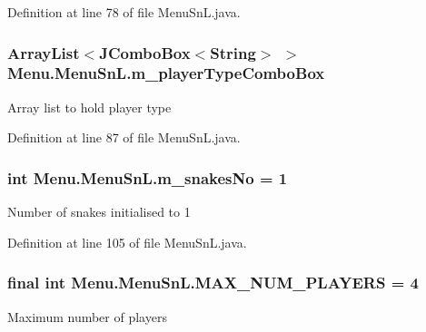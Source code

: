 Definition at line 78 of file Menu\+Sn\+L.\+java.

\hypertarget{class_menu_1_1_menu_sn_l_a70c6fa4562124ab11bab5d572daf82b3}{}
\subsubsection[{m\+\_\+player\+Type\+Combo\+Box}]{\setlength{\rightskip}{0pt plus 5cm}Array\+List$<$J\+Combo\+Box$<$String$>$ $>$ Menu.\+Menu\+Sn\+L.\+m\+\_\+player\+Type\+Combo\+Box\hspace{0.3cm}{\ttfamily [private]}}\label{class_menu_1_1_menu_sn_l_a70c6fa4562124ab11bab5d572daf82b3}
Array list to hold player type 

Definition at line 87 of file Menu\+Sn\+L.\+java.

\hypertarget{class_menu_1_1_menu_sn_l_a5787c03e612eb9adb0f0ee976810be88}{}
\subsubsection[{m\+\_\+snakes\+No}]{\setlength{\rightskip}{0pt plus 5cm}int Menu.\+Menu\+Sn\+L.\+m\+\_\+snakes\+No = 1\hspace{0.3cm}{\ttfamily [private]}}\label{class_menu_1_1_menu_sn_l_a5787c03e612eb9adb0f0ee976810be88}
Number of snakes initialised to 1 

Definition at line 105 of file Menu\+Sn\+L.\+java.

\hypertarget{class_menu_1_1_menu_sn_l_afc7fd19db34602b6b5a85df60c736103}{}
\subsubsection[{M\+A\+X\+\_\+\+N\+U\+M\+\_\+\+P\+L\+A\+Y\+E\+R\+S}]{\setlength{\rightskip}{0pt plus 5cm}final int Menu.\+Menu\+Sn\+L.\+M\+A\+X\+\_\+\+N\+U\+M\+\_\+\+P\+L\+A\+Y\+E\+R\+S = 4\hspace{0.3cm}{\ttfamily [private]}}\label{class_menu_1_1_menu_sn_l_afc7fd19db34602b6b5a85df60c736103}
Maximum number of players 


